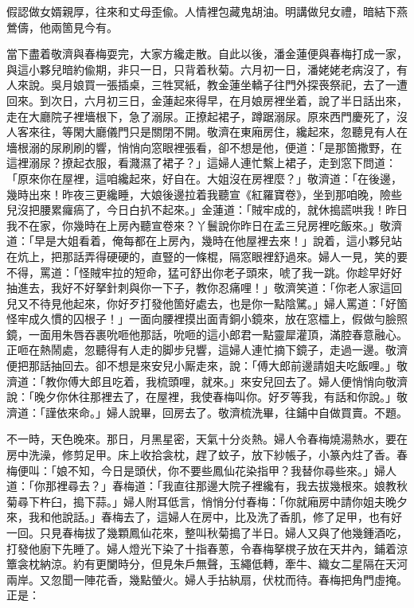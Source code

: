 \begin{myquote}
假認做女婿親厚，往來和丈母歪偸。人情裡包藏鬼胡油。明講做兒女禮，暗結下燕鶯儔，他兩箇見今有。
\end{myquote}

當下盡着敬濟與春梅耍完，大家方纔走散。自此以後，潘金蓮便與春梅打成一家，與這小夥兒暗約偸期，非只一日，只背着秋菊。六月初一日，潘姥姥老病沒了，有人來說。吳月娘買一張插桌，三牲冥紙，教金蓮坐轎子往門外探䘮祭祀，去了一遭回來。到次日，六月初三日，金蓮起來得早，在月娘房裡坐着，說了半日話出來，走在大廳院子裡墻根下，急了溺尿。正撩起裙子，蹲踞溺尿。原來西門慶死了，沒人客來往，等閑大廳儀門只是關閉不開。敬濟在東廂房住，纔起來，忽聽見有人在墻根溺的尿刷刷的響，悄悄向窓眼裡張看，卻不想是他，便道：「是那箇撒野，在這裡溺尿？撩起衣服，看濺濕了裙子？」這婦人連忙繫上裙子，走到窓下問道：「原來你在屋裡，這咱纔起來，好自在。大姐沒在房裡麼？」敬濟道：「在後邊，幾時出來！昨夜三更纔睡，大娘後邊拉着我聽宣《紅羅寶卷》，坐到那咱晚，險些兒沒把腰累㿚瘑了，今日白扒不起來。」{}金蓮道：「賊牢成的，就休搗謊哄我！昨日我不在家，你幾時在上房內聽宣卷來？丫鬟說你昨日在孟三兒房裡吃飯來。」{}敬濟道：「早是大姐看着，俺每都在上房內，幾時在他屋裡去來！」說着，這小夥兒站在炕上，把那話弄得硬硬的，直豎的一條棍，隔窓眼裡舒過來。{}婦人一見，笑的要不得，{}罵道：「怪賊牢拉的短命，猛可舒出你老子頭來，唬了我一跳。你趁早好好抽進去，我好不好拏針刺與你一下子，教你忍痛哩！」敬濟笑道：「你老人家這回兒又不待見他起來，你好歹打發他箇好處去，也是你一點陰騭。」{}婦人罵道：「好箇怪牢成久慣的囚根子！」一面向腰裡摸出面青銅小鏡來，放在窓櫺上，假做勻臉照鏡，一面用朱唇吞裹吮咂他那話，{}吮咂的這小郎君一點靈犀灌頂，滿腔春意融心。正咂在熱鬧處，忽聽得有人走的脚步兒響，這婦人連忙摘下鏡子，走過一邊。敬濟便把那話抽回去。卻不想是來安兒小厮走來，說：「傅大郎前邊請姐夫吃飯哩。」敬濟道：「教你傅大郎且吃着，我梳頭哩，就來。」來安兒回去了。婦人便悄悄向敬濟說：「晚夕你休往那裡去了，在屋裡，我使春梅叫你。好歹等我，有話和你說。」敬濟道：「謹依來命。」婦人說畢，回房去了。敬濟梳洗畢，往鋪中自做買賣。不題。

不一時，天色晚來。那日，月黑星密，天氣十分炎熱。婦人令春梅燒湯熱水，要在房中洗澡，修剪足甲。床上收拾衾枕，趕了蚊子，放下紗帳子，小篆內炷了香。春梅便叫：「娘不知，今日是頭伏，你不要些鳳仙花染指甲？我替你尋些來。」{}婦人道：「你那裡尋去？」春梅道：「我直往那邊大院子裡纔有，我去拔幾根來。娘教秋菊尋下杵臼，搗下蒜。」婦人附耳低言，悄悄分付春梅：「你就廂房中請你姐夫晚夕來，我和他說話。」春梅去了，這婦人在房中，比及洗了香肌，修了足甲，也有好一回。只見春梅拔了幾顆鳳仙花來，整叫秋菊搗了半日。婦人又與了他幾鍾酒吃，打發他廚下先睡了。婦人燈光下染了十指春蔥，令春梅拏櫈子放在天井內，鋪着涼簟衾枕納涼。約有更闌時分，但見朱戶無聲，玉繩低轉，牽牛、織女二星隔在天河兩岸。又忽聞一陣花香，幾點螢火。婦人手拈紈扇，伏枕而待。春梅把角門虛掩。正是：

